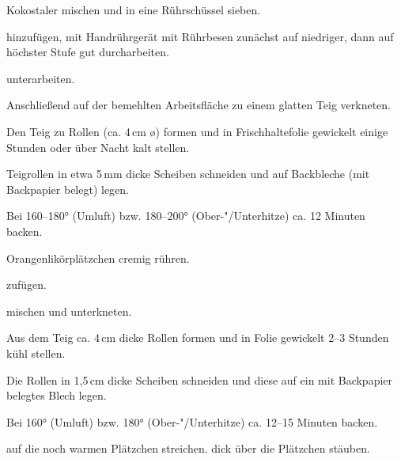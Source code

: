 \begin{recipe}{Kokostaler}
  mischen und in eine Rührschüssel sieben.

  hinzufügen, mit Handrührgerät mit Rührbesen zunächst auf niedriger,
  dann auf höchster Stufe gut durcharbeiten.

  unterarbeiten.
  
  Anschließend auf der bemehlten Arbeitsfläche zu einem glatten Teig
  verkneten.
  
  Den Teig zu Rollen (ca. 4\,cm \o) formen und in Frischhaltefolie gewickelt
  einige Stunden oder über Nacht kalt stellen.
  
  Teigrollen in etwa 5\,mm dicke Scheiben schneiden und auf Backbleche
  (mit Backpapier belegt) legen.

  Bei 160--180° (Umluft) bzw. 180--200° (Ober-"/Unterhitze) ca. 12 Minuten backen.
\end{recipe}



\begin{recipe}{Orangenlikörplätzchen}
  cremig rühren.

  zufügen.

  mischen und unterkneten.

  Aus dem Teig ca. 4\,cm dicke Rollen formen und in Folie gewickelt 2--3
  Stunden kühl stellen.

  Die Rollen in 1,5\,cm dicke Scheiben schneiden und diese auf ein mit
  Backpapier belegtes Blech legen.

  Bei 160° (Umluft) bzw. 180° (Ober-"/Unterhitze) ca. 12--15 Minuten backen.

  auf die noch warmen Plätzchen streichen.
  dick über die Plätzchen stäuben.
\end{recipe}



